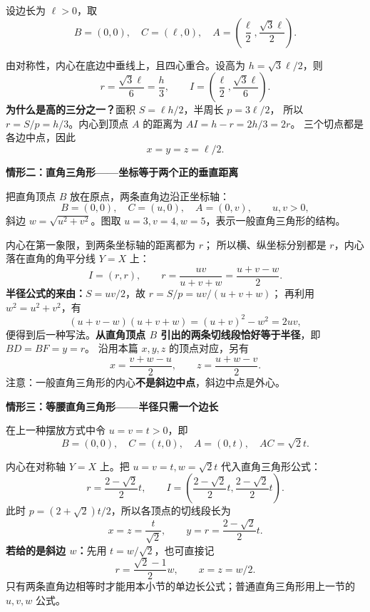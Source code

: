 \begin{explanationbox}
\begin{minipage}{\linewidth}
设边长为 $\ell>0$，取
\[
 B=(0,0),\quad C=(\ell,0),\quad
 A=\left(\frac\ell2,\frac{\sqrt3\ell}{2}\right).
\]
\end{minipage}\par
由对称性，内心在底边中垂线上，且四心重合。设高为 $h=\sqrt3\ell/2$，则
\[
 \boxed{r=\frac{\sqrt3\ell}{6}=\frac h3},\qquad
 \boxed{I=\left(\frac\ell2,\frac{\sqrt3\ell}{6}\right)}.
\]
\textbf{为什么是高的三分之一？}面积 $S=\ell h/2$，半周长 $p=3\ell/2$，
所以 $r=S/p=h/3$。内心到顶点 $A$ 的距离为 $AI=h-r=2h/3=2r$。
三个切点都是各边中点，因此
\[
 \boxed{x=y=z=\ell/2}.
\]

\medskip
\par\noindent\begin{minipage}{\linewidth}
\textbf{\textcolor{CExplanation}{情形二：直角三角形——坐标等于两个正的垂直距离}}

把直角顶点 $B$ 放在原点，两条直角边沿正坐标轴：
\[
 B=(0,0),\quad C=(u,0),\quad A=(0,v),\qquad u,v>0,
\]
斜边 $w=\sqrt{u^2+v^2}$。图取 $u=3,v=4,w=5$，表示一般直角三角形的结构。
\end{minipage}\par
内心在第一象限，到两条坐标轴的距离都为 $r$；
所以横、纵坐标分别都是 $r$，内心落在直角的角平分线 $Y=X$ 上：
\[
 \boxed{I=(r,r)},\qquad
 \boxed{r=\frac{uv}{u+v+w}=\frac{u+v-w}{2}}.
\]
\textbf{半径公式的来由：}$S=uv/2$，故 $r=S/p=uv/(u+v+w)$；
再利用 $w^2=u^2+v^2$，有
\[
 (u+v-w)(u+v+w)=(u+v)^2-w^2=2uv,
\]
便得到后一种写法。\textbf{从直角顶点 $B$ 引出的两条切线段恰好等于半径}，即 $BD=BF=y=r$。
沿用本篇 $x,y,z$ 的顶点对应，另有
\[
 x=\frac{v+w-u}{2},\qquad z=\frac{u+w-v}{2}.
\]
注意：一般直角三角形的内心\textbf{不是斜边中点}，斜边中点是外心。

\medskip
\par\noindent\begin{minipage}{\linewidth}
\textbf{\textcolor{CExplanation}{情形三：等腰直角三角形——半径只需一个边长}}

在上一种摆放方式中令 $u=v=t>0$，即
\[
 B=(0,0),\quad C=(t,0),\quad A=(0,t),\quad AC=\sqrt2t.
\]
\end{minipage}\par
内心在对称轴 $Y=X$ 上。把 $u=v=t,w=\sqrt2t$ 代入直角三角形公式：
\[
 \boxed{r=\frac{2-\sqrt2}{2}t},\qquad
 \boxed{I=\left(\frac{2-\sqrt2}{2}t,\frac{2-\sqrt2}{2}t\right)}.
\]
此时 $p=(2+\sqrt2)t/2$，所以各顶点的切线段长为
\[
 \boxed{x=z=\frac{t}{\sqrt2}},\qquad \boxed{y=r=\frac{2-\sqrt2}{2}t}.
\]
\textbf{若给的是斜边 $w$：}先用 $t=w/\sqrt2$，也可直接记
\[
 \boxed{r=\frac{\sqrt2-1}{2}w},\qquad \boxed{x=z=w/2}.
\]
只有两条直角边相等时才能用本小节的单边长公式；普通直角三角形用上一节的 $u,v,w$ 公式。


\end{explanationbox}

